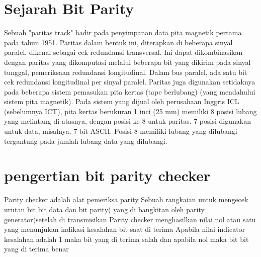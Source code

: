 \section{Sejarah Bit Parity}
Sebuah "paritas track" hadir pada penyimpanan data pita magnetik pertama pada tahun 1951. Paritas dalam bentuk ini, diterapkan di beberapa sinyal paralel, dikenal sebagai cek redundansi transversal. Ini dapat dikombinasikan dengan paritas yang dikomputasi melalui beberapa bit yang dikirim pada sinyal tunggal, pemeriksaan redundansi longitudinal. Dalam bus paralel, ada satu bit cek redundansi longitudinal per sinyal paralel.
Paritas juga digunakan setidaknya pada beberapa sistem pemasukan pita kertas (tape berlubang) (yang mendahului sistem pita magnetik). Pada sistem yang dijual oleh perusahaan Inggris ICL (sebelumnya ICT), pita kertas berukuran 1 inci (25 mm) memiliki 8 posisi lubang yang melintang di atasnya, dengan posisi ke 8 untuk paritas. 7 posisi digunakan untuk data, misalnya, 7-bit ASCII. Posisi 8 memiliki lubang yang dilubangi tergantung pada jumlah lubang data yang dilubangi.

\section{pengertian bit parity checker}
Parity checker adalah alat pemeriksa parity
Sebuah rangkaian untuk mengecek urutan bit bit data dan bit parity( yang di bangkitan  oleh parity generator)setelah di transmisikan
Parity checker menghasilkan nilai nol atau satu yang menunjukan indikasi kesalahan bit saat di terima
Apabila nilai indicator  kesalahan adalah 1 maka bit yang di terima salah dan apabila nol maka bit bit yang di terima benar
